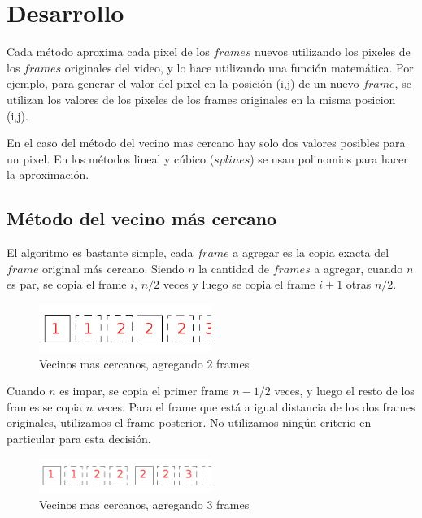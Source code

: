 \section{Desarrollo}

Cada método aproxima cada pixel de los $frames$ nuevos utilizando los pixeles de los $frames$ originales del video, y lo hace utilizando una función matemática. 
Por ejemplo, para generar el valor del pixel en la posición (i,j) de un nuevo $frame$, se utilizan los valores de los pixeles de los frames originales en la misma posicion (i,j). 

En el caso del método del vecino mas cercano hay solo dos valores posibles para un pixel. En los métodos lineal y cúbico ($splines$) se usan polinomios para hacer la aproximación.

\subsection{Método del vecino más cercano}
El algoritmo es bastante simple, cada $frame$ a agregar es la copia exacta del $frame$ original más cercano. Siendo $n$ la cantidad de $frames$ a agregar, cuando $n$ es par, se copia el frame $i$, $n/2$ veces y luego se copia el frame $i+1$ otras $n/2$. 

\begin{figure}[h!]
  \caption{Vecinos mas cercanos, agregando 2 frames}
  \centering
    \includegraphics[width=0.5\textwidth]{imagenes/genCopypar.png}
\end{figure}

Cuando $n$ es impar, se copia el primer frame $n-1/2$ veces, y luego el resto de los frames se copia $n$ veces. Para el frame que está a igual distancia de los dos frames originales, utilizamos el frame posterior. No utilizamos ningún criterio en particular para esta decisión.

\begin{figure}[h!]
  \caption{Vecinos mas cercanos, agregando 3 frames}
  \centering
    \includegraphics[width=0.5\textwidth]{imagenes/genCopyImpar.png}
\end{figure}

